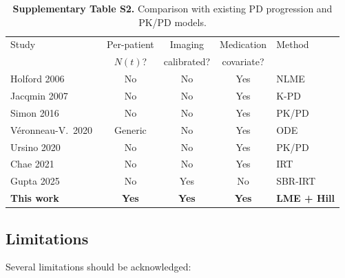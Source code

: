 \begin{table}[t]
\centering
\caption{\textbf{Supplementary Table S2.} Comparison with existing PD progression and PK/PD models.}
\label{tab:s2_comparison}
\footnotesize
\begin{tabular}{@{}lcccl@{}}
\toprule
Study & Per-patient & Imaging & Medication & Method \\
      & $N(t)$?     & calibrated? & covariate? & \\
\midrule
Holford 2006~\cite{holford2006} & No & No & Yes & NLME \\
Jacqmin 2007~\cite{jacqmin2007} & No & No & Yes & K-PD \\
Simon 2016~\cite{simon2016} & No & No & Yes & PK/PD \\
V\'{e}ronneau-V.\ 2020~\cite{veronneau2020} & Generic & No & Yes & ODE \\
Ursino 2020~\cite{ursino2020} & No & No & Yes & PK/PD \\
Chae 2021~\cite{chae2021} & No & No & Yes & IRT \\
Gupta 2025~\cite{gupta2025} & No & Yes & No & SBR-IRT \\
\textbf{This work} & \textbf{Yes} & \textbf{Yes} & \textbf{Yes} & \textbf{LME + Hill} \\
\bottomrule
\end{tabular}
\end{table}


\subsection{Limitations}

Several limitations should be acknowledged:

